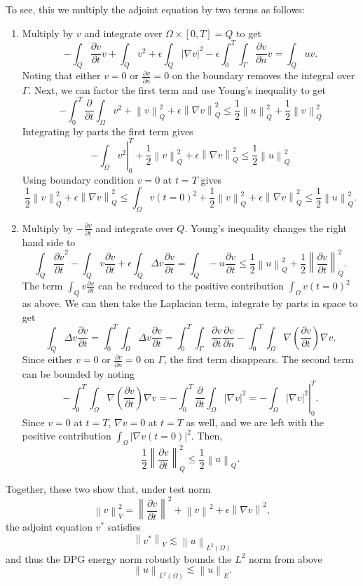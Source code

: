 \documentclass{article}
\newcommand{\grad}{\nabla}
\newcommand{\pd}[2]{\frac{\partial#1}{\partial#2}}
\newcommand{\nor}[1]{\left\| #1 \right\|}
\newcommand{\LRp}[1]{\left( #1 \right)}
\newcommand{\LRb}[1]{\left| #1 \right|}
\renewcommand{\L}{L^2\LRp{\Omega}}
\begin{document}
To see, this we multiply the adjoint equation by two terms as follows:
\begin{enumerate}
\item Multiply by $v$ and integrate over $\Omega \times [0,T] = Q$ to get
\[
-\int_Q \pd{v}{t}v + \int_Q v^2 + \epsilon \int_Q \LRb{\grad v}^2 - \epsilon \int_0^T\int_{\Gamma} \pd{v}{n}v = \int_Q uv.
\]
Noting that either $v = 0$ or $\pd{v}{n} = 0$ on the boundary removes the integral over $\Gamma$.  Next, we can factor the first term and use Young's inequality to get
\[
-\int_0^T  \pd{}{t}\int_{\Omega} v^2 + \nor{v}^2_Q + \epsilon \nor{\grad v}^2_Q \leq \frac{1}{2}\nor{u}^2_Q + \frac{1}{2}\nor{v}^2_Q
\]
Integrating by parts the first term gives
\[
-\left.\int_{\Omega} v^2\right|_0^T + \frac{1}{2}\nor{v}^2_Q + \epsilon \nor{\grad v}^2_Q \leq \frac{1}{2}\nor{u}^2_Q
\]
Using boundary condition $v=0$ at $t= T$ gives
\[
\frac{1}{2}\nor{v}^2_Q + \epsilon \nor{\grad v}^2_Q \leq \int_{\Omega} v(t=0)^2 + \frac{1}{2}\nor{v}^2_Q + \epsilon \nor{\grad v}^2_Q \leq \frac{1}{2}\nor{u}^2_Q.
\]

\item Multiply by $-\pd{v}{t}$ and integrate over $Q$.  Young's inequality changes the right hand side to 
\[
\int_Q\pd{v}{t}^2 - \int_Q v\pd{v}{t} + \epsilon\int_Q \Delta v \pd{v}{t} = \int_Q -u \pd{v}{t} \leq \frac{1}{2}\nor{u}_Q^2 + \frac{1}{2}\nor{\pd{v}{t}}_Q^2 .
\]
The term $\int_Q v\pd{v}{t}$ can be reduced to the positive contribution $\int_{\Omega}{v(t=0)}^2  $ as above.  We can then take the Laplacian term, integrate by parts in space to get
\[
\int_Q \Delta v \pd{v}{t} = \int_0^T \int_{\Omega} \Delta v \pd{v}{t} =  \int_0^T \int_{\Gamma} \pd{v}{t}\pd{v}{n} - \int_0^T \int_{\Omega}\grad\LRp{\pd{v}{t}}\grad v.
\]
Since either $v = 0$ or $\pd{v}{n} = 0$ on $\Gamma$, the first term disappears.  The second term can be bounded by noting
\[
- \int_0^T \int_{\Omega}\grad\LRp{\pd{v}{t}}\grad v = - \int_0^T \pd{}{t}\int_{\Omega}\LRb{\grad v} ^2 = - \left.\int_{\Omega}\LRb{\grad v}^2 \right|_0^T.
\]
Since $v = 0$ at $t=T$, $\grad v = 0$ at $t=T$ as well, and we are left with the positive contribution $\int_{\Omega}\LRb{\grad v(t=0)}^2$.  Then,
\[
\frac{1}{2}\nor{\pd{v}{t}}_Q^2 \leq \frac{1}{2}\nor{u}_Q.
\]
\end{enumerate}
Together, these two show that, under test norm
\[
\nor{v}_V^2 = \nor{\pd{v}{t}}^2 + \nor{v}^2 + \epsilon\nor{\grad v}^2,
\]
the adjoint equation $v^*$ satisfies
\[
\nor{v^*}_V \lesssim \nor{u}_{\L}
\]
and thus the DPG energy norm robustly bounds the $L^2$ norm from above
\[
\nor{u}_{\L} \lesssim \nor{u}_E.
\]
\end{document}
